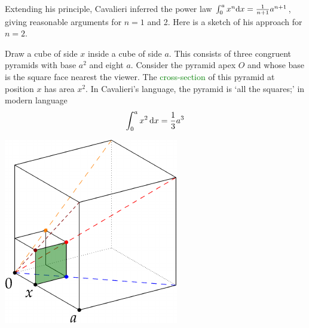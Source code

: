 Extending his principle, Cavalieri inferred the power law $\int_0^ax^n{\mathrm{d} x}=\frac 1{n+1}a^{n+1}$, giving reasonable arguments for $n=1$ and 2. Here is a sketch of his approach for $n=2$.\par
\begin{minipage}[t]{0.68\linewidth}\vspace{0pt}
	Draw a cube of side $x$ inside a cube of side $a$. This consists of three congruent pyramids with base $a^2$ and eight $a$.\smallbreak
	Consider the pyramid apex $O$ and whose base is the square face nearest the viewer. The \textcolor{Green}{cross-section} of this pyramid at position $x$ has area $x^2$. In Cavalieri's language, the pyramid is `all the squares;' in modern language
	\[
		\int_0^ax^2\,{\mathrm{d} x}=\frac 13a^3
	\]
\end{minipage}
\hfill
\begin{minipage}[t]{0.3\linewidth}\vspace{-10pt}
	\flushright
\href{http://www.math.uci.edu/~ndonalds/math184/analytic-cavalieri.html}{\includegraphics[scale=0.9]{analytic-cavalieri}}
\end{minipage}\medbreak


